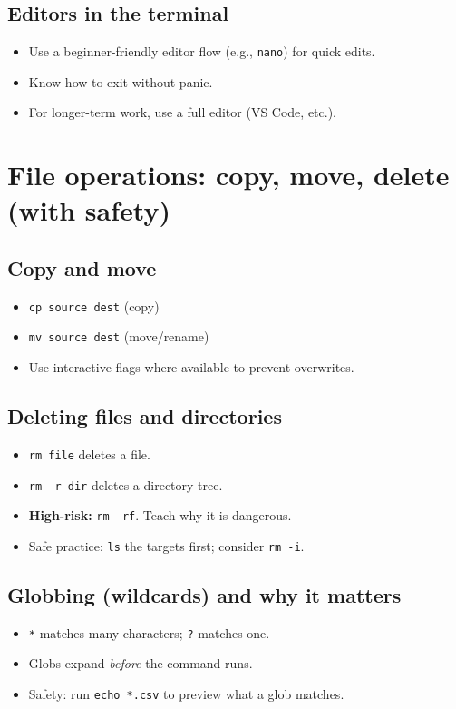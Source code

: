 \subsection{Editors in the terminal}
\begin{itemize}
\item Use a beginner-friendly editor flow (e.g., \texttt{nano}) for quick edits.
\item Know how to exit without panic.
\item For longer-term work, use a full editor (VS Code, etc.).
\end{itemize}

\section{File operations: copy, move, delete (with safety)}
\subsection{Copy and move}
\begin{itemize}
\item \texttt{cp source dest} (copy)
\item \texttt{mv source dest} (move/rename)
\item Use interactive flags where available to prevent overwrites.
\end{itemize}

\subsection{Deleting files and directories}
\begin{itemize}
\item \texttt{rm file} deletes a file.
\item \texttt{rm -r dir} deletes a directory tree.
\item \textbf{High-risk:} \texttt{rm -rf}. Teach why it is dangerous.
\item Safe practice: \texttt{ls} the targets first; consider \texttt{rm -i}.
\end{itemize}

\subsection{Globbing (wildcards) and why it matters}
\begin{itemize}
\item \texttt{*} matches many characters; \texttt{?} matches one.
\item Globs expand \emph{before} the command runs.
\item Safety: run \texttt{echo *.csv} to preview what a glob matches.
\end{itemize}

